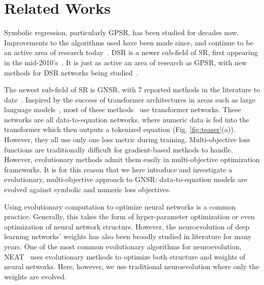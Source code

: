 \section{Related Works}
Symbolic regression, particularly GPSR\cite{Koza1992}, has been studied for decades now. Improvements to the algorithms used have been made since, and continue to be an active area of research today~\cite{LaCava2021,Zojaji2022,Haider2023,Yang2023,Fleck2024}. DSR is a newer sub-field of SR, first appearing in the mid-2010's~\cite{Martius2016}. It is just as active an area of research as GPSR, with new methods for DSR networks being studied~\cite{Petersen2019,Zhang2023,Boddupalli2023}.

The newest sub-field of SR is GNSR, with 7 reported methods in the literature to date~\cite{Biggio2020,Biggio2021,Valipour2021,Kamienny2022,Vastl2022,Li2022,Bendinelli2023}. Inspired by the success of transformer architectures in areas such as large language models~\cite{Vaswani2017,Keskar2019,Wang2019language}, most of these methods~\cite{Biggio2021,Valipour2021,Kamienny2022,Vastl2022,Li2022,Bendinelli2023} use transformer networks. These networks are all data-to-equation networks, where numeric data is fed into the transformer which then outputs a tokenized equation (Fig. \ref{fig:teaser}(a)).
However, they all use only one loss metric during training. Multi-objective loss functions are traditionally difficult for gradient-based methods to handle. However, evolutionary methods admit them easily in multi-objective optimization frameworks. It is for this reason that we here introduce and investigate a evolutionary, multi-objective approach to GNSR: data-to-equation models are evolved against symbolic and numeric loss objectives.

Using evolutionary computation to optimize neural networks is a common practice\cite{Jin2009,Feurer2019,Biswas2021,Tani2021}. Generally, this takes the form of hyper-parameter optimization or even optimization of neural network structure. However, the neuroevolution of deep learning networks' weights has also been broadly studied in literature for many years\cite{Montana1989,Rocha2007,Floreano2008,Ding2013,Stanley2019,Galvan2021}. One of the most common evolutionary algorithms for neuroevolution, NEAT~\cite{Stanley2002} uses evolutionary methods to optimize both structure and weights of neural networks. Here, however, we use traditional neuroevolution where only the weights are evolved.
